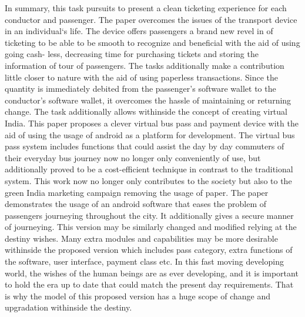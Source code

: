 In summary, this task pursuits to present a clean ticketing experience for each conductor and passenger. The paper overcomes the issues of the transport device in an individual`s life. The device offers passengers a brand new revel in of ticketing to be able to be smooth to recognize and beneficial with the aid of using going cash- less, decreasing time for purchasing tickets and storing the information of tour of passengers. The tasks additionally make a contribution little closer to nature with the aid of using paperless transactions. Since the quantity is immediately debited from the passenger's software wallet to the conductor's software wallet, it overcomes the hassle of maintaining or returning change. The task additionally allows withinside the concept of creating virtual India.
This paper proposes a clever virtual bus pass and payment device with the aid of using the usage of android as a platform for development. The virtual bus pass system includes functions that could assist the day by day commuters of their everyday bus journey now no longer only conveniently of use, but additionally proved to be a cost-efficient technique in contrast to the traditional system. This work now no longer only contributes to the society but also to the green India marketing campaign removing the usage of paper. The paper demonstrates the usage of an android software that eases the problem of passengers journeying throughout the city. It additionally gives a secure manner of journeying. This version may be similarly changed and modified relying at the destiny wishes. Many extra modules and capabilities may be more desirable withinside the proposed version which includes pass category, extra functions of the software, user interface, payment class etc. In this fast moving developing world, the wishes of the human beings are as ever developing, and it is important to hold the era up to date that could match the present day requirements. That is why the model of this proposed version has a huge scope of change and upgradation withinside the destiny.
